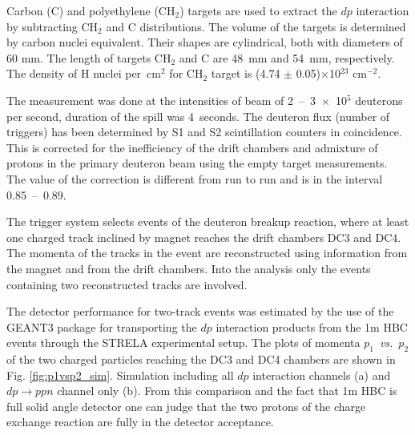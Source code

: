 \documentclass[twocolumn,epjc3]{svjour3}
\newcommand{\dpfrag} {\ensuremath{dp \rightarrow ppn}\xspace}
\begin{document}
Carbon (C) and polyethylene (CH$_2$) targets are used to extract the $dp$
interaction by subtracting CH$_2$ and C distributions. The volume of the targets
is determined by carbon nuclei equivalent. Their shapes are cylindrical, both
with diameters of 60 mm. The length of targets CH$_2$ and C are 48~mm and 54~mm,
respectively. The density of H nuclei per~cm$^2$ for CH$_2$ target is (4.74
$\pm$ 0.05)$\times$10$^{23}$ cm$^{-2}$.

The measurement was done at the intensities of beam of 2~--~3~$\times$~10$^5$
deuterons per second, duration of the spill was 4~seconds. The deuteron flux
(number of triggers) has been determined by S1 and S2 scintillation counters in
coincidence. This is corrected for the inefficiency of the drift chambers and
admixture of protons in the primary deuteron beam using the empty target
measurements. The value of the correction is different from run to run and is in
the interval 0.85~--~0.89.

The trigger system selects events of the deuteron breakup reaction, where at
least one charged track inclined by magnet reaches the drift chambers DC3 and
DC4. The momenta of the tracks in the event are reconstructed using information
from the magnet and from the drift chambers. Into the analy\-sis only the events
containing two reconstructed tracks are involved.

The detector performance for two-track events was estimated by the use of the
GEANT3 package for transporting the $dp$ interaction products from the 1m HBC
events through the STRELA experimental setup. The plots of momenta
$p_1$~\textit{vs.}~$p_2$ of the two charged particles reaching the DC3 and DC4
chambers are shown in Fig. \ref{fig:p1vsp2_sim}. Simulation including all $dp$
interaction channels (a) and \dpfrag channel only (b). From this comparison and
the fact that 1m HBC is full solid angle detector one can judge that the two
protons of the charge exchange reaction are fully in the detector acceptance.
\end{document}
